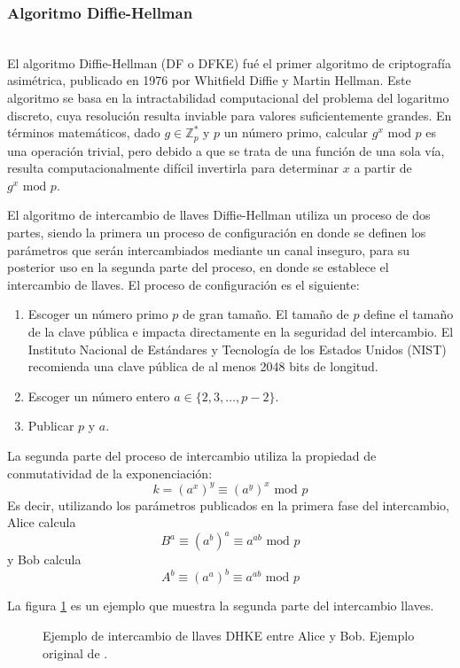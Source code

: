 \subsubsection{Algoritmo Diffie-Hellman}
\hfil \\
El algoritmo Diffie-Hellman (DF o DFKE) fué el primer algoritmo de criptografía asimétrica, publicado en 1976 por Whitfield Diffie y Martin Hellman.
Este algoritmo se basa en la intractabilidad computacional del problema del logaritmo discreto, cuya resolución resulta inviable para valores suficientemente grandes.
En términos matemáticos, dado $g \in \mathbb{Z}^*_p $ y $p$ un número primo, calcular $g^x \text{ mod } p$ es una operación trivial, pero debido a que se trata de una función de una sola vía, resulta computacionalmente difícil invertirla para determinar $x$ a partir de $g^x \text{ mod } p$.

El algoritmo de intercambio de llaves Diffie-Hellman utiliza un proceso de dos partes, siendo la primera un proceso de configuración en donde se definen los parámetros que serán intercambiados mediante un canal inseguro, para su posterior uso en la segunda parte del proceso, en donde se establece el intercambio de llaves.
El proceso de configuración es el siguiente:
\begin{enumerate}
    \item Escoger un número primo $p$ de gran tamaño. El tamaño de $p$ define el tamaño de la clave pública e impacta directamente en la seguridad del intercambio. El Instituto Nacional de Estándares y Tecnología de los Estados Unidos (NIST) recomienda una clave pública de al menos 2048 bits de longitud.
    \item Escoger un número entero $a \in \{ 2,3, \dots,p-2 \}$.
    \item Publicar $p$ y $a$.
\end{enumerate}
La segunda parte del proceso de intercambio utiliza la propiedad de conmutatividad de la exponenciación:
$$ k = (a^x)^y \equiv (a^y)^x \text{ mod } p $$
Es decir, utilizando los parámetros publicados en la primera fase del intercambio, Alice calcula $$B^a \equiv (a^b)^a \equiv a^{ab} \text{ mod } p$$ y Bob calcula $$A^b \equiv (a^a)^b \equiv a^{ab} \text{ mod } p$$

La figura \ref{fig:DHKE_example} es un ejemplo que muestra la segunda parte del intercambio llaves.

\begin{figure}[H]
    \centering
    \noindent
    \caption{Ejemplo de intercambio de llaves DHKE entre Alice y Bob. Ejemplo original de \cite{paar-2011}. }
    \label{fig:DHKE_example}
\end{figure}



